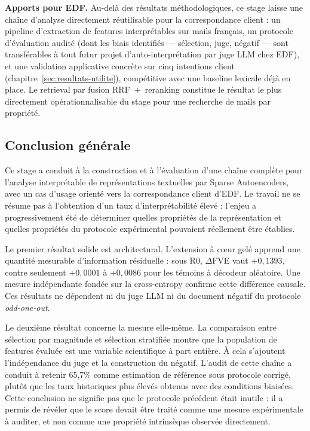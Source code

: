 \documentclass[11pt]{article}
\begin{document}
\textbf{Apports pour EDF.} Au-delà des résultats méthodologiques, ce stage
laisse une chaîne d'analyse directement réutilisable pour la correspondance
client : un pipeline d'extraction de features interprétables sur mails
français, un protocole d'évaluation audité (dont les biais identifiés
--- sélection, juge, négatif --- sont transférables à tout futur projet
d'auto-interprétation par juge LLM chez EDF), et une validation applicative
concrète sur cinq intentions client (chapitre~\ref{sec:resultats-utilite}),
compétitive avec une baseline lexicale déjà en place. Le retrieval par
fusion RRF~+~reranking constitue le résultat le plus directement
opérationnalisable du stage pour une recherche de mails par propriété.

\subsection{Conclusion générale}

Ce stage a conduit à la construction et à l'évaluation d'une chaîne complète pour
l'analyse interprétable de représentations textuelles par Sparse Autoencoders, avec
un cas d'usage orienté vers la correspondance client d'EDF. Le travail ne se résume
pas à l'obtention d'un taux d'interprétabilité élevé : l'enjeu a progressivement été
de déterminer quelles propriétés de la représentation et quelles propriétés du
protocole expérimental pouvaient réellement être établies.

Le premier résultat solide est architectural. L'extension à cœur gelé apprend une
quantité mesurable d'information résiduelle : sous R0, $\Delta$FVE vaut $+0{,}1393$,
contre seulement $+0{,}0001$ à $+0{,}0086$ pour les témoins à décodeur aléatoire. Une
mesure indépendante fondée sur la cross-entropy confirme cette différence causale.
Ces résultats ne dépendent ni du juge LLM ni du document négatif du protocole
\emph{odd-one-out}.

Le deuxième résultat concerne la mesure elle-même. La comparaison entre sélection par
magnitude et sélection stratifiée montre que la population de features évaluée est
une variable scientifique à part entière. À cela s'ajoutent l'indépendance du juge et
la construction du négatif. L'audit de cette chaîne a conduit à retenir 65,7\% comme
estimation de référence sous protocole corrigé, plutôt que les taux historiques plus
élevés obtenus avec des conditions biaisées. Cette conclusion ne signifie pas que le
protocole précédent était inutile : il a permis de révéler que le score devait être
traité comme une mesure expérimentale à auditer, et non comme une propriété intrinsèque
observée directement.
\end{document}
